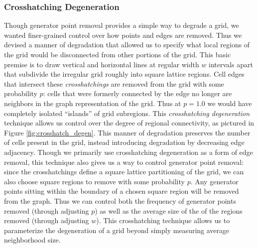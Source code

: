 \documentclass[a4paper,11pt]{report}
\begin{document}
\subsubsection{Crosshatching Degeneration}
Though generator point removal provides a simple way to degrade a grid, we wanted finer-grained control over how points and edges are removed. Thus we devised a manner of degradation that allowed us to specify what local regions of the grid would be disconnected from other portions of the grid. This basic premise is to draw vertical and horizontal lines at regular width $w$ intervals apart that subdivide the irregular grid roughly into square lattice regions. Cell edges that intersect these \textit{crosshatchings} are removed from the grid with some probability $p$: cells that were formerly connected by the edge no longer are neighbors in the graph representation of the grid. Thus at $p=1.0$ we would have completely isolated ``islands'' of grid subregions. This \textit{crosshatching degeneration} technique allows us control over the degree of regional connectivity, as pictured in Figure \ref{fig:crosshatch_degen}. This manner of degradation preserves the number of cells present in the grid, instead introducing degradation by decreasing edge adjacency. Though we primarily use crosshatching degeneration as a form of edge removal, this technique also gives us a way to control generator point removal: since the crosshatchings define a square lattice partitioning of the grid, we can also choose square regions to remove with some probability $p$. Any generator points sitting within the boundary of a chosen square region will be removed from the graph. Thus we can control both the frequency of generator points removed (through adjusting $p$) as well as the average size of the of the regions removed (through adjusting $w$). This crosshatching technique allows us to parameterize the degeneration of a grid beyond simply measuring average neighborhood size.
\end{document}
